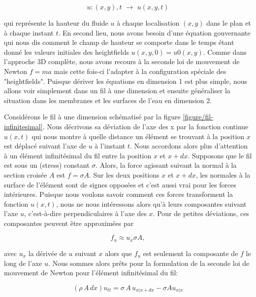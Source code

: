 \documentclass[11pt]{report}
\begin{document}
\begin{equation}
u: (x,y),t \,\, \longrightarrow \,\, u(x,y,t)
\end{equation}

qui représente la hauteur du fluide $u$ à chaque localisation $(x,y)$ dans le plan et à chaque instant $t$. En second lieu, nous avons besoin d'une équation gouvernante qui nous dis comment le champ de hauteur se comporte dans le temps étant donné les valeurs initiales des heightfields $u(x,y,0) = u0(x,y)$. Comme dans l'approche 3D complète, nous avons recours à la seconde loi de mouvement de Newton $f = ma$ mais cette fois-ci l'adapter à la configuration spéciale des "heightfields". Puisque dériver les équations en dimension 1 est plus simple, nous allons voir simplement dans un fil à une dimension et ensuite généraliser la situation dans les membranes et les surfaces de l'eau en dimension 2.

Considérons le fil à une dimension schématisé par la figure \ref{figure/fil-infinitesimal}. Nous décrivons sa déviation de l'axe des x par la fonction continue $u(x,t)$ qui nous montre à quelle distance un élément se trouvant à la position $x$ est déplacé suivant l'axe de $u$ à l'instant $t$. Nous accordons alors plus d'attention à un élément infinitésimal du fil entre la position $x$ et $x + dx$. Supposons que le fil est sous un (stress) constant $\sigma$. Alors, la force agissant suivant la normal à la section croisée $A$ est $f = \sigma A$. Sur les deux positions $x$ et $x + dx$, les normales à la surface de l'élément sont de signes opposées et c'est aussi vrai pour les forces intérieures. Puisque nous voulons savoir comment ces forces transforment la fonction $u(x,t)$, nous ne nous intéressons alors qu'à leurs composantes suivant l'axe $u$, c'est-à-dire perpendiculaires à l'axe des $x$. Pour de petites déviations, ces composantes peuvent être approximées par 

\begin{equation}
f_u \approx u_x \sigma A,
\end{equation} 

avec $u_x$ la dérivée de $u$ suivant $x$ alors que $f_u$ est seulement la composante de $f$ le long de l'axe $u$. Nous sommes alors prêts pour la formulation de la seconde loi de mouvement de Newton pour l'élément infinitésimal du fil:

\begin{equation}
(\rho\, A\, dx)u_{tt} = \sigma\, A \,u_{x|x+dx} - \sigma A u_{x|x}
\end{equation}
\end{document}
